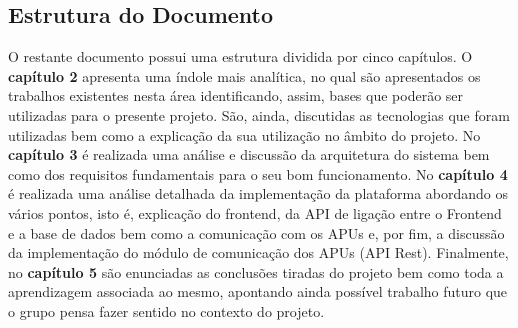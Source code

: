 \subsection{Estrutura do Documento}
O restante documento possui uma estrutura dividida por cinco capítulos. O \textbf{capítulo 2} apresenta uma índole mais analítica, no qual são apresentados os trabalhos existentes nesta área identificando, assim, bases que poderão ser utilizadas para o presente projeto. São, ainda, discutidas as tecnologias que foram utilizadas bem como a explicação da sua utilização no âmbito do projeto. No \textbf{capítulo 3} é realizada uma análise e discussão da arquitetura do sistema bem como dos requisitos fundamentais para o seu bom funcionamento. No \textbf{capítulo 4} é realizada uma análise detalhada da implementação da plataforma abordando os vários pontos, isto é, explicação do frontend, da API de ligação entre o Frontend e a base de dados bem como a comunicação com os APUs e, por fim, a discussão da implementação do módulo de comunicação dos APUs (API Rest). Finalmente, no \textbf{capítulo 5} são enunciadas as conclusões tiradas do projeto bem como toda a aprendizagem associada ao mesmo, apontando ainda possível trabalho futuro que o grupo pensa fazer sentido no contexto do projeto.